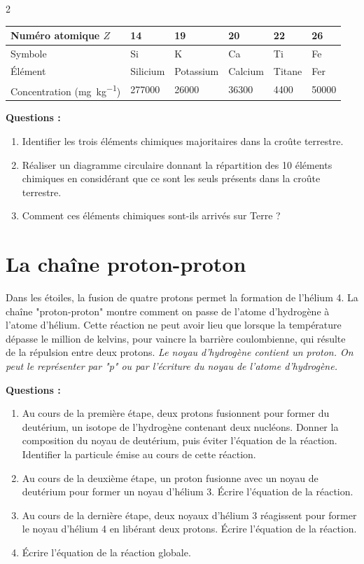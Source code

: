 \documentclass[a4paper,11pt,fleqn]{article}%
\begin{document}
\begin{multicols}{2}
\begin{scriptsize}
\noindent
\begin{tabular}{|>{\centering}m{1.5cm}|>{\centering}m{1cm}|>{\centering}m{1.2cm}|>{\centering}m{.8cm}|>{\centering}m{1.3cm}|>{\centering\arraybackslash}m{1.2cm}|} \hline
\textbf{Numéro atomique $Z$} & \textbf{14} & \textbf{19} & \textbf{20} & \textbf{22} & \textbf{26}\\ \hline
Symbole & Si & K & Ca & Ti & Fe\\ \hline
Élément & Silicium & Potassium & Calcium & Titane & Fer\\ \hline
Concentration (\unit{\milli\gram\per\kilo\gram}) & \num{277000} & \num{26000} & \num{36300} & \num{4400} & \num{50000}\\ \hline
\end{tabular}
\end{scriptsize}

\textbf{Questions :}
\begin{enumerate}
	\item Identifier les trois éléments chimiques majoritaires dans la croûte terrestre.
	\item Réaliser un diagramme circulaire donnant la répartition des 10 éléments chimiques en considérant que ce sont les seuls présents dans la croûte terrestre.
	\item Comment ces éléments chimiques sont-ils arrivés sur Terre ?
\end{enumerate}

\section{La chaîne proton-proton}
Dans les étoiles, la fusion de quatre protons permet la formation de l'hélium 4. La chaîne "proton-proton" montre comment on passe de l'atome d'hydrogène à l'atome d'hélium. Cette réaction ne peut avoir lieu que lorsque la température dépasse le million de kelvins, pour vaincre la barrière coulombienne, qui résulte de la répulsion entre deux protons. \emph{Le noyau d'hydrogène contient un proton. On peut le représenter par "p" ou par l'écriture du noyau de l'atome d'hydrogène.}

\textbf{Questions :}
\begin{enumerate}
	\item Au cours de la première étape, deux protons fusionnent pour former du deutérium, un isotope de l'hydrogène contenant deux nucléons. Donner la composition du noyau de deutérium, puis éviter l'équation de la réaction. Identifier la particule émise au cours de cette réaction.
	\item Au cours de la deuxième étape, un proton fusionne avec un noyau de deutérium pour former un noyau d'hélium 3. Écrire l'équation de la réaction.
	\item Au cours de la dernière étape, deux noyaux d'hélium 3 réagissent pour former le noyau d'hélium 4 en libérant deux protons. Écrire l'équation de la réaction.
	\item Écrire l'équation de la réaction globale.
\end{enumerate}


\end{multicols}
\end{document}
